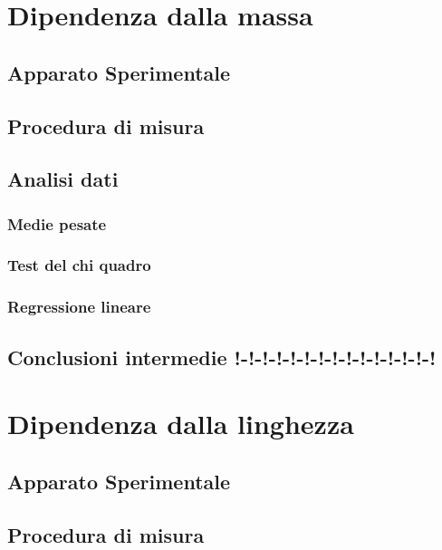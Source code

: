 \documentclass[11pt, twoside, a4paper]{article}
\begin{document}

\newpage

\newpage


\section{Dipendenza dalla massa}
%
	\subsection{Apparato Sperimentale}
	
	\subsection{Procedura di misura}
	
	\subsection{Analisi dati}
		\subsubsection{Medie pesate}
		
		\subsubsection{Test del chi quadro}
		
		\subsubsection{Regressione lineare}
		
	\subsection{Conclusioni intermedie !-!-!-!-!-!-!-!-!-!-!-!-!-!-!}
	
\newpage
\section{Dipendenza dalla linghezza}
	\subsection{Apparato Sperimentale}
	
	\subsection{Procedura di misura}
	
\end{document}
